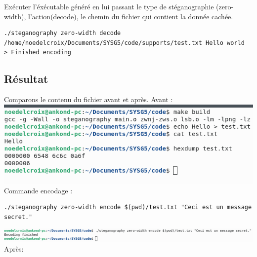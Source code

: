 Exécuter l'éxécutable généré en lui passant le type de stéganographie (zero-width), l'action(decode), le chemin du fichier qui contient la donnée cachée.
\begin{lstlisting}
./steganography zero-width decode /home/noedelcroix/Documents/SYSG5/code/supports/test.txt Hello world
> Finished encoding
\end{lstlisting}


\subsection{Résultat}
Comparons le contenu du fichier avant et après.
\newline
Avant : 
\newline
\includegraphics[width=1\textwidth]{img/resultat_before_zero-width.png}
Commande encodage :
\begin{lstlisting}
./steganography zero-width encode $(pwd)/test.txt "Ceci est un message secret."
\end{lstlisting}
\includegraphics[width=1\textwidth]{img/resultat_commande_zero-width.png}
\newline
Après:
\newline
